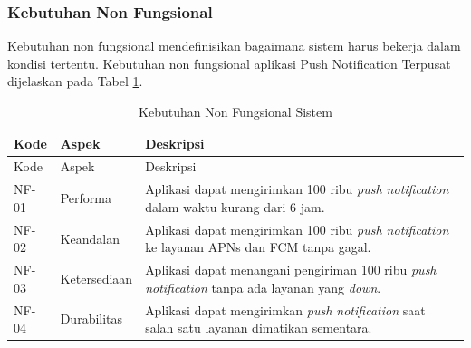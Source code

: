 \subsubsection{Kebutuhan Non Fungsional}
\par Kebutuhan non fungsional mendefinisikan bagaimana sistem harus bekerja dalam kondisi tertentu. Kebutuhan non fungsional aplikasi Push Notification Terpusat dijelaskan pada Tabel \ref{t:non_fungsional}.
\begin{longtable}{|p{1.2cm}|p{2cm}|p{5.5cm}|}
	\caption{Kebutuhan Non Fungsional Sistem} \label{t:non_fungsional} \\ \hline
    \rowcolor{lightgray} Kode & Aspek & Deskripsi \\ \hline
    \endfirsthead
    \hline
    \rowcolor{lightgray} Kode & Aspek & Deskripsi \\ \hline
    \endhead
    NF-01 & Performa & Aplikasi dapat mengirimkan 100 ribu \textit{push notification} dalam waktu kurang dari 6 jam. \\ \hline
    NF-02 & Keandalan & Aplikasi dapat mengirimkan 100 ribu \textit{push notification} ke layanan APNs dan FCM tanpa gagal. \\ \hline
    NF-03 & Ketersediaan & Aplikasi dapat menangani pengiriman 100 ribu \textit{push notification} tanpa ada layanan yang \textit{down}. \\ \hline
    NF-04 & Durabilitas & Aplikasi dapat mengirimkan \textit{push notification} saat salah satu layanan dimatikan sementara. \\ \hline
\end{longtable}

